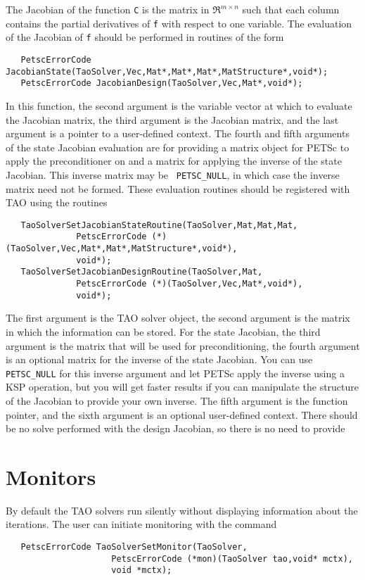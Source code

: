 The Jacobian of the function {\tt C} is the matrix in $\Re^{m \times n}$
such that each column contains the partial derivatives of {\tt f} with respect
to one variable. 
The evaluation of the Jacobian of {\tt f} should be performed in routines
of the form
\begin{verbatim}
   PetscErrorCode JacobianState(TaoSolver,Vec,Mat*,Mat*,Mat*,MatStructure*,void*);
   PetscErrorCode JacobianDesign(TaoSolver,Vec,Mat*,void*);
\end{verbatim}
\noindent
In this function, the second argument is the variable vector at which to 
evaluate the Jacobian matrix, the third argument is the Jacobian matrix,
and the last argument is a pointer to a user-defined context. The fourth and
fifth arguments of the state Jacobian evaluation are for providing a matrix
object 
for PETSc to apply the preconditioner on and a matrix for applying
the inverse of the state Jacobian. This inverse matrix may be {\tt
  PETSC\_NULL},
in which case the inverse matrix need not be formed.
These evaluation routines should be registered with TAO using the routines
\begin{verbatim}
   TaoSolverSetJacobianStateRoutine(TaoSolver,Mat,Mat,Mat,
              PetscErrorCode (*)(TaoSolver,Vec,Mat*,Mat*,MatStructure*,void*), 
              void*);
   TaoSolverSetJacobianDesignRoutine(TaoSolver,Mat,
              PetscErrorCode (*)(TaoSolver,Vec,Mat*,void*), 
              void*);
\end{verbatim}
\noindent
The first argument is the TAO solver object, the second
argument is the matrix in which the information can be stored.
For the state Jacobian, 
the third argument is the matrix that will be used for preconditioning,
the fourth argument is an optional matrix for the inverse of the state 
Jacobian.  You can use {\tt PETSC\_NULL} for this inverse argument and let 
PETSc apply the inverse using a KSP operation, but you will get faster
results if you can manipulate the structure of the Jacobian to provide your
own inverse. The fifth argument is the function pointer, and the sixth argument is
an optional user-defined context. There should be no solve performed with the
design Jacobian, so there is no need to provide 


\section{Monitors}

By default the TAO solvers run silently without displaying information
about the iterations. The user can initiate monitoring with the
command  
\begin{verbatim}
   PetscErrorCode TaoSolverSetMonitor(TaoSolver,
                     PetscErrorCode (*mon)(TaoSolver tao,void* mctx),
                     void *mctx);
\end{verbatim}
\noindent

